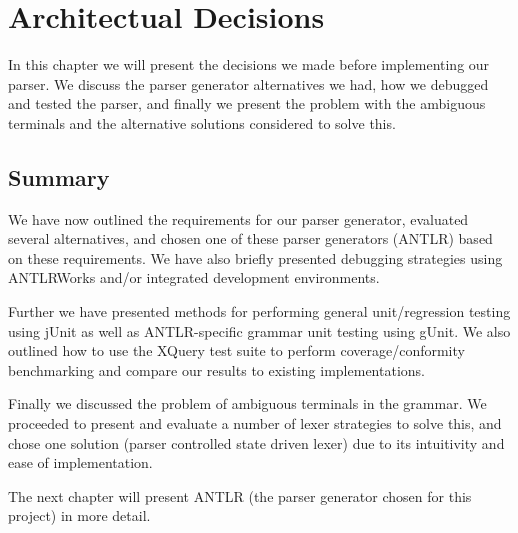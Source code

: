 \chapter{Architectual Decisions}
\label{chapter:method}

In this chapter we will present the decisions we made before implementing our
parser. We discuss the parser generator alternatives we had, how we debugged and
tested the parser, and finally we present the problem with the ambiguous
terminals and the alternative solutions considered to solve this.





\section{Summary}
We have now outlined the requirements for our parser generator, evaluated
several alternatives, and chosen one of these parser generators (ANTLR) based on
these requirements. We have also briefly presented debugging
strategies using ANTLRWorks and/or integrated development environments.

Further we have presented methods for performing general unit/regression testing
using jUnit as well as ANTLR-specific grammar unit testing using gUnit. We also
outlined how to use the XQuery test suite to perform coverage/conformity
benchmarking and compare our results to existing implementations.

Finally we discussed the problem of ambiguous terminals in the grammar. We
proceeded to present and evaluate a number of lexer strategies to solve this,
and chose one solution (parser controlled state driven lexer) due to its
intuitivity and ease of implementation.

The next chapter will present ANTLR (the parser generator chosen for this
project) in more detail.
